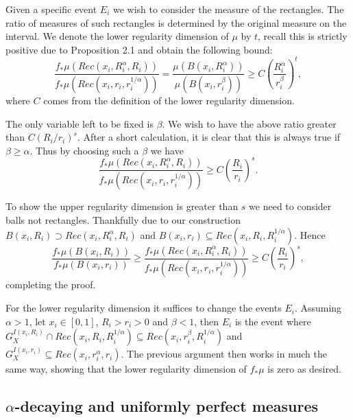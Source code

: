 \documentclass[12pt]{amsart}
\numberwithin{equation}{section}
\renewcommand{\ge}{\geqslant}
\begin{document}
Given a specific event $E_i$ we wish to consider the measure of the rectangles. The ratio of measures of such rectangles is determined by the original measure on the interval. We denote the lower regularity dimension of $\mu$ by $t$, recall this is strictly positive due to Proposition 2.1 and obtain the following bound:
\[
\frac{f_*\mu(Rec(x_i,R_i^{\alpha},R_i))}{f_*\mu(Rec(x_i,r_i,r_i^{1/\alpha}))} = \frac{\mu(B(x_i, R_i^{\alpha}))}{\mu(B(x_i, r_i^{\beta}))} \ge C\left(\frac{R_i^{\alpha}}{r_i^{\beta}}\right)^t, 
\]
where $C$ comes from the definition of the lower regularity dimension.

The only variable left to be fixed is $\beta$. We wish to have the above ratio greater than $C(R_i/r_i)^s$. After a short calculation, it is clear that this is always true if $\beta \ge \alpha$. Thus by choosing such a $\beta$ we have
\[
\frac{f_*\mu(Rec(x_i,R_i^{\alpha},R_i))}{f_*\mu(Rec(x_i,r_i,r_i^{1/\alpha}))} \ge C\left(\frac{R_i}{r_i}\right)^s. 
\]

To show the upper regularity dimension is greater than $s$ we need to consider balls not rectangles. Thankfully due to our construction $B(x_i,R_i) \supset Rec(x_i, R_i^\alpha, R_i)$ and $B(x_i,r_i) \subseteq Rec(x_i, R_i, R_i^{1/\alpha})$. Hence
\[
\frac{f_*\mu(B(x_i,R_i))}{f_*\mu(B(x_i,r_i))} \ge \frac{f_*\mu(Rec(x_i,R_i^{\alpha},R_i))}{f_*\mu(Rec(x_i,r_i,r_i^{1/\alpha}))} \ge C\left(\frac{R_i}{r_i}\right)^s ,
\]
completing the proof.


For the lower regularity dimension it suffices to change the events $E_i$. Assuming $\alpha>1$, let $x_i \in [0,1]$, $R_i > r_i > 0$ and $\beta < 1$, then $E_i$ is the event where $G_X^{I(x_i, R_i)} \cap Rec(x_i,R_i,R_i^{1/\alpha}) \subseteq Rec(x_i, r_i^{\beta}, R_i^{1/\alpha})$ and $G_X^{I(x_i, r_i)} \subseteq Rec(x_i, r_i^{\alpha}, r_i)$. The previous argument then works in much the same way, showing that the lower regularity dimension of $f_*\mu$ is zero as desired.






\subsection{$\alpha$-decaying and uniformly perfect measures}
\end{document}

